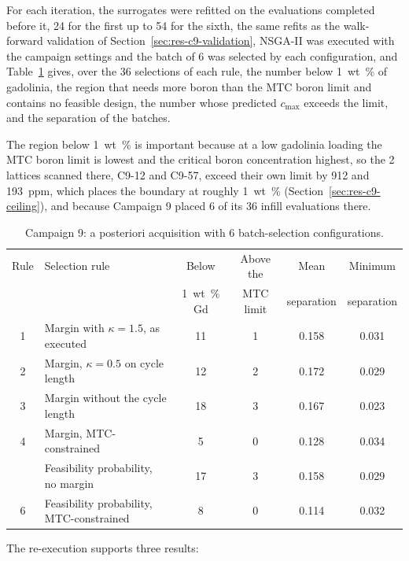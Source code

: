 For each iteration, the surrogates were refitted on the evaluations
completed before it, 24 for the first up to 54 for the sixth, the same
refits as the walk-forward validation of
Section~\ref{sec:res-c9-validation}, NSGA-II was executed with the
campaign settings and the batch of 6 was selected by each
configuration, and
Table~\ref{tab:c9-acq-replay} gives, over the 36 selections of each
rule, the number below \SI{1}{wt\%} of gadolinia, the region that needs
more boron than the MTC boron limit and contains no feasible design, the
number whose predicted $c_\mathrm{max}$ exceeds the limit, and the
separation of the batches.

The region below \SI{1}{wt\%} is important because at a low gadolinia loading the MTC boron limit is lowest and the
critical boron concentration highest, so the 2 lattices scanned there,
C9-12 and C9-57, exceed their own limit by 912 and \SI{193}{ppm}, which
places the boundary at roughly \SI{1}{wt\%}
(Section~\ref{sec:res-c9-ceiling}), and because Campaign 9 placed 6 of
its 36 infill evaluations there.

\begin{table}[!htb]
  \centering
  \footnotesize
  \caption{Campaign 9: a posteriori acquisition with 6 batch-selection configurations.}
  \label{tab:c9-acq-replay}
    \setlength{\tabcolsep}{4pt}
    \begin{tabularx}{\textwidth}{@{}c>{\raggedright\arraybackslash}Xcccc@{}}
    \toprule
    Rule & Selection rule & Below & Above the & Mean & Minimum \\
     & & \SI{1}{wt\%} Gd & MTC limit & separation & separation \\
    \midrule
        1 & Margin with $\kappa = 1.5$, as executed & 11 & 1 & 0.158 & 0.031 \\
    2 & Margin, $\kappa = 0.5$ on cycle length & 12 & 2 & 0.172 & 0.029 \\
    3 & Margin without the cycle length & 18 & 3 & 0.167 & 0.023 \\
    4 & Margin, MTC-constrained & 5 & 0 & 0.128 & 0.034 \\
    \addlinespace[2pt]
    5 & Feasibility probability, no margin & 17 & 3 & 0.158 & 0.029 \\
    6 & Feasibility probability, MTC-constrained & 8 & 0 & 0.114 & 0.032 \\
    \bottomrule
  \end{tabularx}
\end{table}

The re-execution supports three results:

